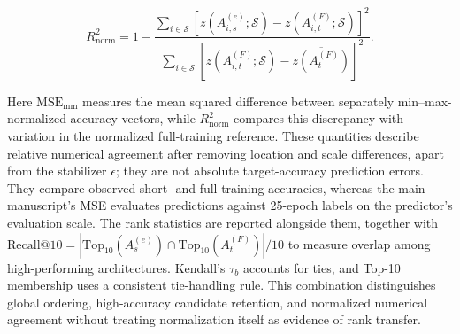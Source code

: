 \documentclass[preprint,review,12p,times]{elsarticle}
\begin{document}
\begin{equation}
R^2_{\mathrm{norm}}=1-\frac{\sum_{i\in\mathcal S}\left[z(A_{i,s}^{(e)};\mathcal S)-z(A_{i,t}^{(F)};\mathcal S)\right]^2}{\sum_{i\in\mathcal S}\left[z(A_{i,t}^{(F)};\mathcal S)-\overline{z(A_t^{(F)})}\right]^2}.
\end{equation}

Here $\mathrm{MSE}_{\mathrm{mm}}$ measures the mean squared difference between separately min--max-normalized accuracy vectors, while $R^2_{\mathrm{norm}}$ compares this discrepancy with variation in the normalized full-training reference. These quantities describe relative numerical agreement after removing location and scale differences, apart from the stabilizer $\epsilon$; they are not absolute target-accuracy prediction errors. They compare observed short- and full-training accuracies, whereas the main manuscript's MSE evaluates predictions against 25-epoch labels on the predictor's evaluation scale. The rank statistics are reported alongside them, together with $\mathrm{Recall@10}=|\mathrm{Top}_{10}(A_s^{(e)})\cap\mathrm{Top}_{10}(A_t^{(F)})|/10$ to measure overlap among high-performing architectures. Kendall's $\tau_b$ accounts for ties, and Top-10 membership uses a consistent tie-handling rule. This combination distinguishes global ordering, high-accuracy candidate retention, and normalized numerical agreement without treating normalization itself as evidence of rank transfer.
\end{document}
